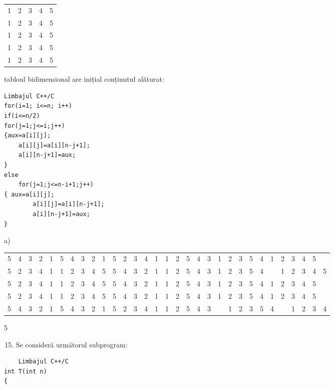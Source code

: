 \begin{center}
\begin{tabular}{lllll}
1 & 2 & 3 & 4 & 5 \\
1 & 2 & 3 & 4 & 5 \\
1 & 2 & 3 & 4 & 5 \\
1 & 2 & 3 & 4 & 5 \\
1 & 2 & 3 & 4 & 5 \\
\end{tabular}
\end{center} tabloul bidimensional are inițial conținutul alăturat:

\begin{verbatim}
Limbajul C++/C
for(i=1; i<=n; i++)
if(i<=n/2)
for(j=1;j<=i;j++)
{aux=a[i][j];
    a[i][j]=a[i][n-j+1];
    a[i][n-j+1]=aux;
}
else
    for(j=1;j<=n-i+1;j++)
{ aux=a[i][j];
        a[i][j]=a[i][n-j+1];
        a[i][n-j+1]=aux;
}
\end{verbatim}

a)

\begin{center}
\begin{tabular}{lllllllllllllllllllllllllllllll}
5 & 4 & 3 & 2 & 1 & 5 & 4 & 3 & 2 & 1 & 5 & 2 & 3 & 4 & 1 & 1 & 2 & 5 & 4 & 3 & 1 & 2 & 3 & 5 & 4 & 1 & 2 & 3 & 4 & 5 &  \\
5 & 2 & 3 & 4 & 1 & 1 & 2 & 3 & 4 & 5 & 5 & 4 & 3 & 2 & 1 & 1 & 2 & 5 & 4 & 3 & 1 & 2 & 3 & 5 & 4 &  & 1 & 2 & 3 & 4 & 5 \\
5 & 2 & 3 & 4 & 1 & 1 & 2 & 3 & 4 & 5 & 5 & 4 & 3 & 2 & 1 & 1 & 2 & 5 & 4 & 3 & 1 & 2 & 3 & 5 & 4 & 1 & 2 & 3 & 4 & 5 &  \\
5 & 2 & 3 & 4 & 1 & 1 & 2 & 3 & 4 & 5 & 5 & 4 & 3 & 2 & 1 & 1 & 2 & 5 & 4 & 3 & 1 & 2 & 3 & 5 & 4 & 1 & 2 & 3 & 4 & 5 &  \\
5 & 4 & 3 & 2 & 1 & 5 & 4 & 3 & 2 & 1 & 5 & 2 & 3 & 4 & 1 & 1 & 2 & 5 & 4 & 3 &  & 1 & 2 & 3 & 5 & 4 &  & 1 & 2 & 3 & 4 \\
\end{tabular}
\end{center} 5

\begin{enumerate}
  \setcounter{enumi}{14}
  \item Se consideră următorul subprogram:
\end{enumerate}

\begin{verbatim}
    Limbajul C++/C
int T(int n)
{
\end{verbatim}

